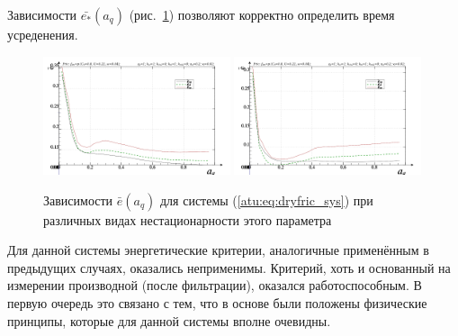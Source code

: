 Зависимости $\bar{e_*}(a_q)$ (рис.~\ref{atu:f:fric_e_a_q})
 позволяют корректно определить время усреденения.

\begin{figure}[htb!]
\centerline{
  \includegraphics[width=0.49\textwidth]{p/cha/fric/fric_m5p-p_a_q_e_sign.png}
  \includegraphics[width=0.49\textwidth]{p/cha/fric/fric_m5p-p_a_q_e_sin.png}
}
  \caption{Зависимости  $\bar{e}(a_q)$ для системы (\ref{atu:eq:dryfric_sys})
  при различных видах нестационарности этого параметра
}
\label{atu:f:fric_e_a_q}
\end{figure}

Для данной системы энергетические критерии, аналогичные применённым в предыдущих случаях,
оказались неприменимы. Критерий, хоть и основанный на измерении производной (после фильтрации),
оказался работоспособным. В первую очередь это связано с тем, что в основе были положены
физические принципы, которые для данной системы вполне очевидны.

